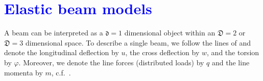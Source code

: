 \documentclass[a4paper, english, 12pt, reqno, draft]{amsart}
\theoremstyle{definition}
\theoremstyle{remark}
\numberwithin{equation}{section}
\newcommand{\locDim}{\ensuremath{\mathfrak d}}
\newcommand{\globDim}{\ensuremath{\mathfrak D}}
\newcommand{\longDef}{\ensuremath{u}}
\newcommand{\crossDef}{\ensuremath{w}}
\newcommand{\torsion}{\ensuremath{\varphi}}
\newcommand{\force}{\ensuremath{q}}
\newcommand{\momentum}{\ensuremath{m}}
\begin{document}
% 
% 
% 
\newpage
% 
\section{\textcolor{blue}{Elastic beam models}}
% 
A beam can be interpreted as a $\locDim = 1$ dimensional object within an $\globDim = 2$ or $\globDim = 3$ dimensional space. To describe a single beam, we follow the lines of \cite[Sect.~1.2.3]{MeskourisH2013} and denote the longitudinal deflection by $\longDef$, the cross deflection by $\crossDef$, and the torsion by $\torsion$. Moreover, we denote the line forces (distributed loads) by $\force$ and the line momenta by $\momentum$, c.f.~\cite[Sect.~1.2.2]{MeskourisH2013}.
% 
\end{document}
